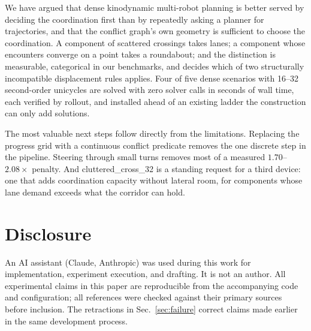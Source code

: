 \documentclass[conference]{IEEEtran}
\begin{document}
We have argued that dense kinodynamic multi-robot planning is better served by deciding the
coordination first than by repeatedly asking a planner for trajectories, and that the
conflict graph's own geometry is sufficient to choose the coordination. A component of
scattered crossings takes lanes; a component whose encounters converge on a point takes a
roundabout; and the distinction is measurable, categorical in our benchmarks, and decides
which of two structurally incompatible displacement rules applies. Four of five dense
scenarios with 16--32 second-order unicycles are solved with zero solver calls in seconds
of wall time, each verified by rollout, and installed ahead of an existing ladder the
construction can only add solutions.

The most valuable next steps follow directly from the limitations. Replacing the progress
grid with a continuous conflict predicate removes the one discrete step in the pipeline.
Steering through small turns removes most of a measured $1.70$--$2.08\times$ penalty. And
cluttered\_cross\_32 is a standing request for a third device: one that adds coordination
capacity without lateral room, for components whose lane demand exceeds what the corridor
can hold.

\section*{Disclosure}

An AI assistant (Claude, Anthropic) was used during this work for implementation,
experiment execution, and drafting. It is not an author. All experimental claims in this
paper are reproducible from the accompanying code and configuration; all references were
checked against their primary sources before inclusion. The retractions in
Sec.~\ref{sec:failure} correct claims made earlier in the same development process.



\end{document}
